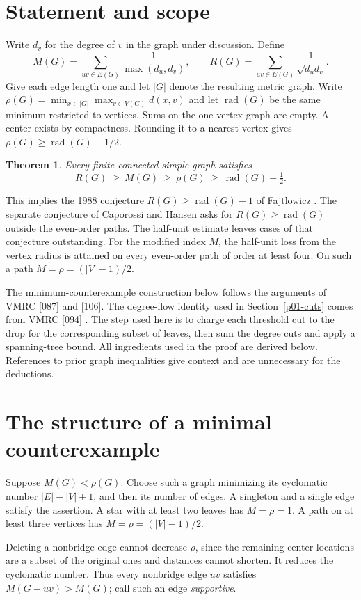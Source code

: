 \documentclass[11pt,a4paper]{article}
\newtheorem{theorem}{Theorem}[section]
\newcommand{\rad}{\operatorname{rad}}\newcommand{\diam}{\operatorname{diam}}
\begin{document}
\section{Statement and scope}
Write $d_v$ for the degree of $v$ in the graph under discussion. Define
\[
 M(G)=\sum_{uv\in E(G)}\frac1{\max(d_u,d_v)},\qquad
 R(G)=\sum_{uv\in E(G)}\frac1{\sqrt{d_ud_v}}.
\]
Give each edge length one and let $|G|$ denote the resulting metric graph.
Write $\rho(G)=\min_{x\in|G|}\max_{v\in V(G)}d(x,v)$ and let $\rad(G)$
be the same minimum restricted to vertices. Sums on the one-vertex graph
are empty. A center exists by compactness. Rounding it to a nearest vertex
gives $\rho(G)\ge\rad(G)-1/2$.

\begin{theorem}\label{p01-main}
Every finite connected simple graph satisfies
\[
 R(G)\ \ge\ M(G)\ \ge\ \rho(G)\ \ge\ \rad(G)-\tfrac12.
\]
\end{theorem}

This implies the 1988 conjecture $R(G)\ge\rad(G)-1$ of Fajtlowicz
\cite{p01-Faj,p01-Deng}. The separate conjecture of Caporossi and Hansen asks
for $R(G)\ge\rad(G)$ outside the even-order paths. The half-unit estimate
leaves cases of that conjecture outstanding. For the modified index $M$,
the half-unit loss from the vertex radius is attained on every even-order
path of order at least four. On such a path $M=\rho=(|V|-1)/2$.

The minimum-counterexample construction below follows the arguments of
VMRC [087] and [106]. The degree-flow identity used in Section~\ref{p01-cuts}
comes from VMRC [094] \cite{p01-VMRC}. The step used here is to charge each threshold
cut to the drop for the corresponding subset of leaves, then sum the
degree cuts and apply a spanning-tree bound. All ingredients used in the
proof are derived below. References to prior graph inequalities give
context and are unnecessary for the deductions.

\section{The structure of a minimal counterexample}
Suppose $M(G)<\rho(G)$. Choose such a graph minimizing its cyclomatic
number $|E|-|V|+1$, and then its number of edges. A singleton and a
single edge satisfy the assertion. A star with at least two leaves has
$M=\rho=1$. A path on at least three vertices has $M=\rho=(|V|-1)/2$.

Deleting a nonbridge edge cannot decrease $\rho$, since the remaining
center locations are a subset of the original ones and distances cannot
shorten. It reduces the cyclomatic number. Thus every nonbridge edge $uv$
satisfies $M(G-uv)>M(G)$; call such an edge \emph{supportive}.
\end{document}
